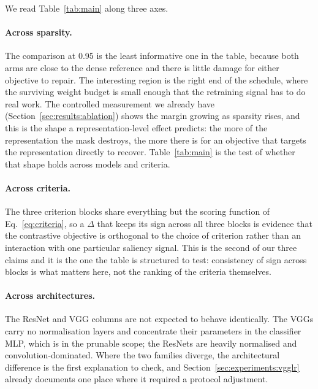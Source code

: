 We read Table~\ref{tab:main} along three axes.

\paragraph{Across sparsity.}
The comparison at 0.95 is the least informative one in the table, because both
arms are close to the dense reference and there is little damage for either
objective to repair. The interesting region is the right end of the schedule,
where the surviving weight budget is small enough that the retraining signal has
to do real work. The controlled measurement we already have
(Section~\ref{sec:results:ablation}) shows the margin growing as sparsity rises,
and this is the shape a representation-level effect predicts: the more of the
representation the mask destroys, the more there is for an objective that targets
the representation directly to recover. Table~\ref{tab:main} is the test of
whether that shape holds across models and criteria.

\paragraph{Across criteria.}
The three criterion blocks share everything but the scoring function of
Eq.~\eqref{eq:criteria}, so a $\Delta$ that keeps its sign across all three blocks
is evidence that the contrastive objective is orthogonal to the choice of
criterion rather than an interaction with one particular saliency signal. This is
the second of our three claims and it is the one the table is structured to test:
consistency of sign across blocks is what matters here, not the ranking of the
criteria themselves.

\paragraph{Across architectures.}
The ResNet and VGG columns are not expected to behave identically. The VGGs carry
no normalisation layers and concentrate their parameters in the classifier MLP,
which is in the prunable scope; the ResNets are heavily normalised and
convolution-dominated. Where the two families diverge, the architectural
difference is the first explanation to check, and Section~\ref{sec:experiments:vgglr}
already documents one place where it required a protocol adjustment.

